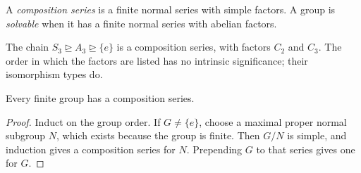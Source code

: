 \begin{definition}
A \emph{composition series} is a finite normal series with simple factors.  A
group is \emph{solvable} when it has a finite normal series with abelian factors.
\end{definition}

\begin{example}
The chain \(S_3\trianglerighteq A_3\trianglerighteq\{e\}\) is a composition
series, with factors \(C_2\) and \(C_3\).  The order in which the factors are
listed has no intrinsic significance; their isomorphism types do.
\end{example}

\begin{proposition}
Every finite group has a composition series.
\end{proposition}
\begin{proof}
Induct on the group order.  If \(G\ne\{e\}\), choose a maximal proper normal
subgroup \(N\), which exists because the group is finite.  Then \(G/N\) is
simple, and induction gives a composition series for \(N\).  Prepending \(G\)
to that series gives one for \(G\).
\end{proof}

